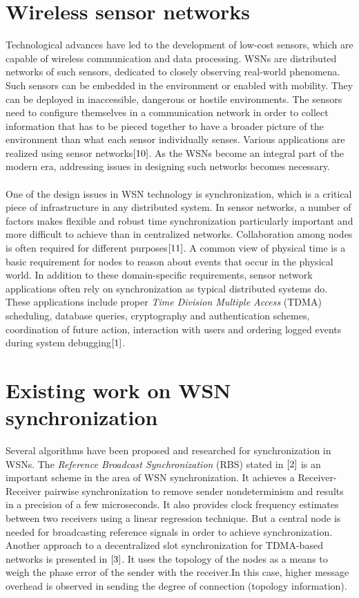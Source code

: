 \documentclass[a4paper,10pt]{report}
\begin{document}
\section{\textbf{Wireless sensor networks}}\par
Technological advances have led to the development of low-cost sensors, which are capable of wireless communication and
data processing. WSNs are distributed networks of such sensors, dedicated to closely observing real-world phenomena. Such sensors can be embedded in the environment or enabled with mobility. They can be deployed in
inaccessible, dangerous or hostile environments. The sensors need to configure themselves in a communication network in order to collect information that has to be pieced together to have a broader picture of the environment than what each sensor individually
senses. Various applications are realized using sensor networks$\cite{10}$. As the WSNs become an integral part of the modern era, addressing issues in designing such networks becomes necessary.
\paragraph*{} One of the design issues in WSN technology is synchronization, which is a critical piece of infrastructure in any
distributed system. In sensor networks, a number of factors makes flexible and robust time synchronization particularly important and
more difficult to achieve than in centralized networks. Collaboration among nodes is often required for different purposes$\cite{11}$. A common view of physical time is a basic requirement for nodes to reason about events that occur in the physical world. In addition to these domain-specific requirements, sensor network applications often rely on synchronization as typical distributed systems do. These applications include proper \textit{Time Division Multiple Access} (TDMA) scheduling, database queries, cryptography and authentication schemes, coordination of future action, interaction with users and ordering logged events during system debugging$\cite{1}$.
\section{\textbf{Existing work on WSN synchronization}}\par
Several algorithms have been proposed and researched for synchronization in WSNs. The \textit{Reference Broadcast
Synchronization} (RBS) stated in $\cite{2}$ is an important scheme in the
area of WSN synchronization. It achieves a Receiver-Receiver pairwise synchronization to remove sender nondeterminism and results
in a precision of a few microseconds. It also provides clock frequency estimates between two receivers using a linear regression
technique. But a central node is needed for broadcasting reference signals in order to achieve synchronization. Another approach to a decentralized slot synchronization for TDMA-based networks is presented in $\cite{3}$. It uses the topology of the nodes as a means to weigh the phase error of the sender with the receiver.In this case, higher message overhead is observed in sending the degree of connection (topology information).
\end{document}
